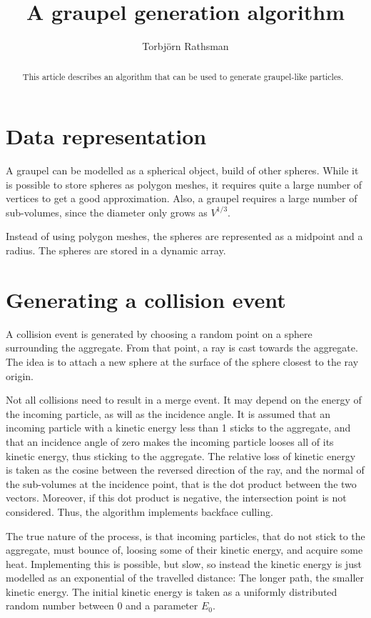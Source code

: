 \documentclass[a4paper,10pt]{scrartcl}
\title{A graupel generation algorithm}
\author{Torbjörn Rathsman}
\begin{document}
\maketitle
\begin{abstract}
This article describes an algorithm that can be used to generate graupel-like particles.
\end{abstract}



\tableofcontents

\section{Data representation} 
A graupel can be modelled as a spherical object, build of other spheres. While it is possible to store spheres as polygon meshes, it requires quite a large number of vertices to get a good approximation. Also, a graupel requires a large number of sub-volumes, since the diameter only grows as $V^{1/3}$.

Instead of using polygon meshes, the spheres are represented as a midpoint and a radius. The spheres are stored in a dynamic array.

\section{Generating a collision event}
A collision event is generated by choosing a random point on a sphere surrounding the aggregate. From that point, a ray is cast towards the aggregate. The idea is to attach a new sphere at the surface of the sphere closest to the ray origin.

Not all collisions need to result in a merge event. It may depend on the energy of the incoming particle, as will as the incidence angle. It is assumed that an incoming particle with a kinetic energy less than 1 sticks to the aggregate, and that an incidence angle of zero makes the incoming particle looses all of its kinetic energy, thus sticking to the aggregate. The relative loss of kinetic energy is taken as the cosine between the reversed direction of the ray, and the normal of the sub-volumes at the incidence point, that is the dot product between the two vectors. Moreover, if this dot product is negative, the intersection point is not considered. Thus, the algorithm implements backface culling.

The true nature of the process, is that incoming particles, that do not stick to the aggregate, must bounce of, loosing some of their kinetic energy, and acquire some heat. Implementing this is possible, but slow, so instead the kinetic energy is just modelled as an exponential of the travelled distance: The longer path, the smaller kinetic energy. The initial kinetic energy is taken as a uniformly distributed random number between 0 and a parameter $E_0$.
\end{document}
